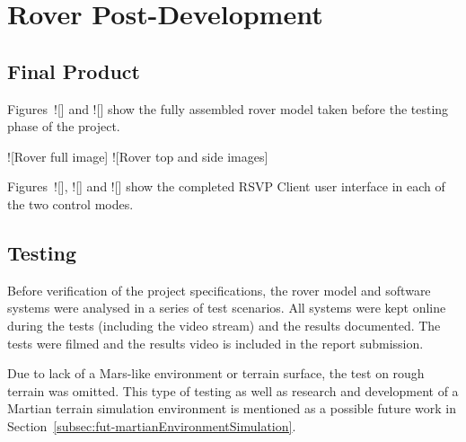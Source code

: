 \chapter{Rover Post-Development}
  \section{Final Product}
    Figures~![] and ![] show the fully assembled rover model taken before the testing phase of the project.
    
    ![Rover full image]
    ![Rover top and side images]
    
    Figures~![], ![] and ![] show the completed RSVP Client user interface in each of the two control modes.
  
  \section{Testing}
    Before verification of the project specifications, the rover model and software systems were analysed in a series of test scenarios. All systems were kept online during the tests (including the video stream) and the results documented. The tests were filmed and the results video is included in the report submission.
    
    Due to lack of a Mars-like environment or terrain surface, the test on rough terrain was omitted. This type of testing as well as research and development of a Martian terrain simulation environment is mentioned as a possible future work in Section~\ref{subsec:fut-martianEnvironmentSimulation}.
    

